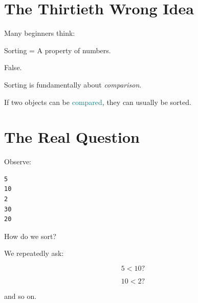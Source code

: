 \documentclass[11pt,a4paper]{book}
\begin{document}

\section{The Thirtieth Wrong Idea}

\begin{trap}

Many beginners think:


Sorting =
A property of numbers.

\textcolor{RosettaRed}{False}.


Sorting is fundamentally about
\emph{comparison}.


If two objects can be \textcolor{teal}{compared},
they can usually be sorted.

\end{trap}


\section{The Real Question}

Observe:

\begin{verbatim} 
5
10
2
30
20
\end{verbatim}


How do we sort?


We repeatedly ask:

\[
5 < 10 ?
\]


\[
10 < 2 ?
\]


and so on.

\end{document}
